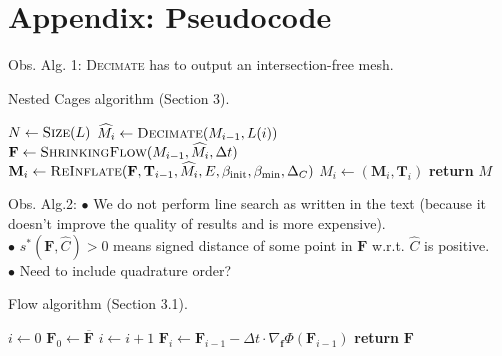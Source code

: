 \section*{Appendix: Pseudocode}
%
\label{app:pseudocode}

\noindent Obs. Alg. 1: \textsc{Decimate} has to output an intersection-free mesh.

\begin{algorithm}
   \caption{Nested Cages algorithm (Section 3).}
   \label{alg:NestedCages}
   \begin{algorithmic}[1]
       
      \State $N \gets \textsc{Size}(L)$
       \State $\widehat{M}_i \gets \textsc{Decimate}(M_{i-1},L(i))$  
       \State $\mathbf{F} \gets \textsc{ShrinkingFlow}(M_{i-1}, \widehat{M}_i,\Delta t)$
       \State $\mathbf{M}_i \gets \textsc{ReInflate}(\textbf{F},\textbf{T}_{i-1},\widehat{M}_i,E,\beta_{\mathrm{init}},\beta_{\mathrm{min}},\Delta_C)$
       \State $M_i \gets (\mathbf{M}_i,\mathbf{T}_i) $ 
      \EndFor
      \State \textbf{return} $M$
      \EndProcedure
   \end{algorithmic}
\end{algorithm}

\noindent Obs. Alg.2: $\bullet$ We do not perform line search as written in the text (because it doesn't improve the quality
of results and is more expensive). \\
$\bullet$ $s^*(\textbf{F},\widehat{C})>0$ means signed distance of some point in $\mathbf{F}$ w.r.t. $\widehat{C}$ is positive. \\
$\bullet$ Need to include quadrature order?

\begin{algorithm}
   \caption{Flow algorithm (Section 3.1).}
   \label{alg:ShrinkingFlow}
   \begin{algorithmic}[1]
       
      \State $i \gets 0$
      \State $\textbf{F}_0 \gets \overline{\mathbf{F}}$
       \State $i \gets i+1 $
       \State $\textbf{F}_i \gets \textbf{F}_{i-1} - \Delta t \cdot  \nabla_{\textbf{f}} \Phi(\textbf{F}_{i-1})$
      \EndWhile
      \State \textbf{return} $\mathbf{F}$
      \EndProcedure
   \end{algorithmic}
\end{algorithm}

